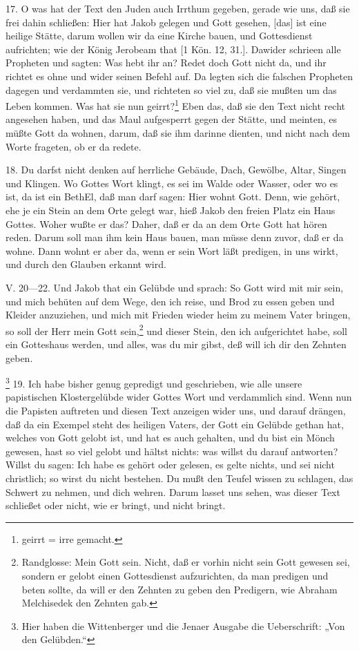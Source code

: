 17. O was hat der Text den Juden auch Irrthum gegeben, gerade wie uns, daß sie frei dahin schließen: Hier hat Jakob gelegen und Gott gesehen, [das] ist eine heilige Stätte, darum wollen wir da eine Kirche bauen, und Gottesdienst aufrichten; wie der König Jerobeam that [1 Kön. 12, 31.]. Dawider schrieen alle Propheten und sagten: Was hebt ihr an? Redet doch Gott nicht da, und ihr richtet es ohne und wider seinen Befehl auf. Da legten sich die falschen Propheten dagegen und verdammten sie, und richteten so viel zu, daß sie mußten um das Leben kommen. Was hat sie nun geirrt?\footnote{geirrt = irre gemacht.} Eben das, daß sie den Text nicht recht angesehen haben, und das Maul aufgesperrt gegen der Stätte, und meinten, es müßte Gott da wohnen, darum, daß sie ihm darinne dienten, und nicht nach dem Worte frageten, ob er da redete.

18. Du darfst nicht denken auf herrliche Gebäude, Dach, Gewölbe, Altar, Singen und Klingen. Wo Gottes Wort klingt, es sei im Walde oder Wasser, oder wo es ist, da ist ein BethEl, daß man darf sagen: Hier wohnt Gott. Denn, wie gehört, ehe je ein Stein an dem Orte gelegt war, hieß Jakob den freien Platz ein Haus Gottes. Woher wußte er das? Daher, daß er da an dem Orte Gott hat hören reden. Darum soll man ihm kein Haus bauen, man müsse denn zuvor, daß er da wohne. Dann wohnt er aber da, wenn er sein Wort läßt predigen, in uns wirkt, und durch den Glauben erkannt wird.

V. 20—22. Und Jakob that ein Gelübde und sprach: So Gott wird mit mir sein, und mich behüten auf dem Wege, den ich reise, und Brod zu essen geben und Kleider anzuziehen, und mich mit Frieden wieder heim zu meinem Vater bringen, so soll der Herr mein Gott sein,\footnote{Randglosse: Mein Gott sein. Nicht, daß er vorhin nicht sein Gott gewesen sei, sondern er gelobt einen Gottesdienst aufzurichten, da man predigen und beten sollte, da will er den Zehnten zu geben den Predigern, wie Abraham Melchisedek den Zehnten gab.} und dieser Stein, den ich aufgerichtet habe, soll ein Gotteshaus werden, und alles, was du mir gibst, deß will ich dir den Zehnten geben.

\footnote{Hier haben die Wittenberger und die Jenaer Ausgabe die Ueberschrift: „Von den Gelübden.“} 19. Ich habe bisher genug gepredigt und geschrieben, wie alle unsere papistischen Klostergelübde wider Gottes Wort und verdammlich sind. Wenn nun die Papisten auftreten und diesen Text anzeigen wider uns, und darauf drängen, daß da ein Exempel steht des heiligen Vaters, der Gott ein Gelübde gethan hat, welches von Gott gelobt ist, und hat es auch gehalten, und du bist ein Mönch gewesen, hast so viel gelobt und hältst nichts: was willst du darauf antworten? Willst du sagen: Ich habe es gehört oder gelesen, es gelte nichts, und sei nicht christlich; so wirst du nicht bestehen. Du mußt den Teufel wissen zu schlagen, das Schwert zu nehmen, und dich wehren. Darum lasset uns sehen, was dieser Text schließet oder nicht, wie er bringt, und nicht bringt.

